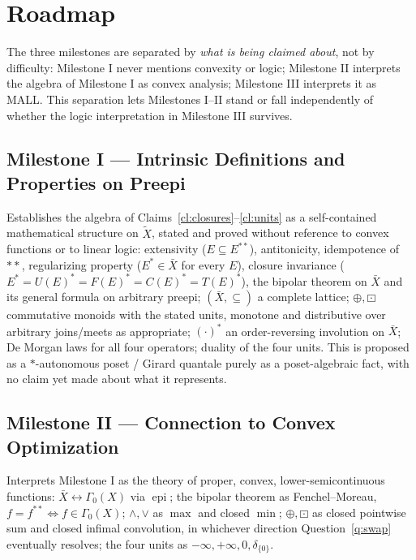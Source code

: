 \documentclass[11pt]{article}
\newcommand{\epi}{\operatorname{epi}}
\begin{document}
\section{Roadmap}\label{sec:milestones}

The three milestones are separated by \emph{what is being claimed about},
not by difficulty: Milestone I never mentions convexity or logic; Milestone
II interprets the algebra of Milestone I as convex analysis; Milestone III
interprets it as MALL. This separation lets Milestones I--II stand or fall
independently of whether the logic interpretation in Milestone III
survives.

\subsection*{Milestone I --- Intrinsic Definitions and Properties on Preepi}

Establishes the algebra of Claims~\ref{cl:closures}--\ref{cl:units} as a
self-contained mathematical structure on $\tilde X$, stated and proved
without reference to convex functions or to linear logic: extensivity
($E\subseteq E^{**}$), antitonicity, idempotence of $**$, regularizing
property ($E^*\in\bar X$ for every $E$), closure invariance
($E^*=U(E)^*=F(E)^*=C(E)^*=T(E)^*$), the bipolar theorem on $\bar X$ and its
general formula on arbitrary preepi; $(\bar X,\subseteq)$ a complete
lattice; $\oplus,\boxdot$ commutative monoids with the stated units,
monotone and distributive over arbitrary joins/meets as appropriate;
$(\cdot)^*$ an order-reversing involution on $\bar X$; De Morgan laws for
all four operators; duality of the four units. This is proposed as a
$*$-autonomous poset / Girard quantale purely as a poset-algebraic fact,
with no claim yet made about what it represents.

\subsection*{Milestone II --- Connection to Convex Optimization}

Interprets Milestone I as the theory of proper, convex, lower-semicontinuous
functions: $\bar X\leftrightarrow\Gamma_0(X)$ via $\epi$; the bipolar
theorem as Fenchel--Moreau, $f=f^{**}\iff f\in\Gamma_0(X)$; $\wedge,\vee$ as
$\max$ and closed $\min$; $\oplus,\boxdot$ as closed pointwise sum and
closed infimal convolution, in whichever direction Question~\ref{q:swap}
eventually resolves; the four units as $-\infty,+\infty,0,\delta_{\{0\}}$.
\end{document}
